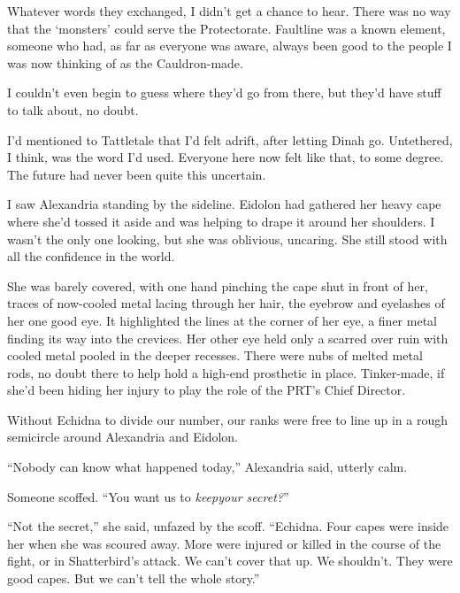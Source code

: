Whatever words they exchanged, I didn't get a chance to hear.  There was no way that the `monsters' could serve the Protectorate.  Faultline was a known element, someone who had, as far as everyone was aware, always been good to the people I was now thinking of as the Cauldron-made.



I couldn't even begin to guess where they'd go from there, but they'd have stuff to talk about, no doubt.



I'd mentioned to Tattletale that I'd felt adrift, after letting Dinah go.  Untethered, I think, was the word I'd used.  Everyone here now felt like that, to some degree.  The future had never been quite this uncertain.



I saw Alexandria standing by the sideline.  Eidolon had gathered her heavy cape where she'd tossed it aside and was helping to drape it around her shoulders.  I wasn't the only one looking, but she was oblivious, uncaring.  She still stood with all the confidence in the world.



She was barely covered, with one hand pinching the cape shut in front of her, traces of now-cooled metal lacing through her hair, the eyebrow and eyelashes of her one good eye.  It highlighted the lines at the corner of her eye, a finer metal finding its way into the crevices.  Her other eye held only a scarred over ruin with cooled metal pooled in the deeper recesses.  There were nubs of melted metal rods, no doubt there to help hold a high-end prosthetic in place.  Tinker-made, if she'd been hiding her injury to play the role of the PRT's Chief Director.



Without Echidna to divide our number, our ranks were free to line up in a rough semicircle around Alexandria and Eidolon.



``Nobody can know what happened today,'' Alexandria said, utterly calm.



Someone scoffed.  ``You want us to \emph{keep}\emph{your secret?}''



``Not the secret,'' she said, unfazed by the scoff.  ``Echidna.  Four capes were inside her when she was scoured away.  More were injured or killed in the course of the fight, or in Shatterbird's attack.  We can't cover that up.  We shouldn't.  They were good capes.  But we can't tell the whole story.''



